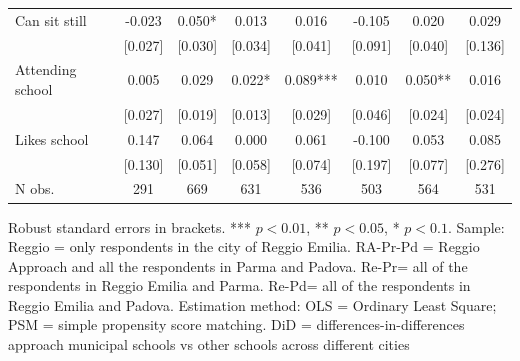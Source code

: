 \documentclass[12pt]{article}
\begin{document}
\begin{table}[ht]
\begin{center}
\begin{adjustbox}{width=1.2\textwidth,center=\textwidth}
\begin{tabular}{lccccccc}
{Can sit still } & {-0.023 } & {0.050{*} } & {0.013 } & {0.016 } & {-0.105 } & {0.020 } & {0.029 }\\
 & [0.027] & [0.030] & [0.034] & [0.041] & [0.091] & [0.040] & [0.136]\\
{Attending school } & {0.005 } & {0.029 } & {0.022{*} } & {0.089{*}{*}{*} } & {0.010 } & {0.050{*}{*} } & {0.016 }\\
 & [0.027] & [0.019] & [0.013] & [0.029] & [0.046] & [0.024] & [0.024]\\
{Likes school } & {0.147 } & {0.064 } & {0.000 } & {0.061 } & {-0.100 } & {0.053 } & {0.085 }\\
 & [0.130] & [0.051] & [0.058] & [0.074] & [0.197] & [0.077] & [0.276]\\
\hline 
{N obs. } & {291 } & {669 } & {631 } & {536 } & {503 } & {564 } & {531 }\\
\hline 
\end{tabular}
\end{adjustbox}
\end{center}

\begin{footnotesize}
\raggedright{Robust standard errors in brackets. *** $p<0.01$, ** $p<0.05$, * $p<0.1$. Sample: Reggio = only respondents in the city of Reggio Emilia. RA-Pr-Pd = Reggio Approach and all the respondents in Parma and Padova. Re-Pr= all of the respondents in Reggio Emilia and Parma. Re-Pd= all of the respondents in Reggio Emilia and Padova. Estimation method: OLS = Ordinary Least Square; PSM = simple propensity score matching. DiD = differences-in-differences approach municipal schools vs other schools across different cities}
\end{footnotesize}
\end{table}
\end{document}
